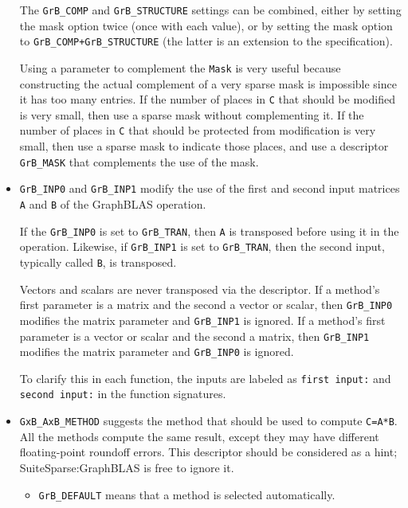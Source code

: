 \documentclass[12pt]{article}
\begin{document}
\begin{itemize}
    The \verb'GrB_COMP' and \verb'GrB_STRUCTURE' settings can be combined,
    either by setting the mask option twice (once with each value), or by
    setting the mask option to \verb'GrB_COMP+GrB_STRUCTURE' (the latter is an
    extension to the specification).

    Using a parameter to complement the \verb'Mask' is very useful because
    constructing the actual complement of a very sparse mask is impossible
    since it has too many entries.  If the number of places in \verb'C'
    that should be modified is very small, then use a sparse mask without
    complementing it.  If the number of places in \verb'C' that should
    be protected from modification is very small, then use a sparse mask
    to indicate those places, and use a descriptor \verb'GrB_MASK' that
    complements the use of the mask.

\item \verb'GrB_INP0' and \verb'GrB_INP1' modify the use of the
    first and second input matrices \verb'A' and \verb'B' of the GraphBLAS
    operation.

    If the \verb'GrB_INP0' is set to \verb'GrB_TRAN', then \verb'A' is
    transposed before using it in the operation.  Likewise, if
    \verb'GrB_INP1' is set to \verb'GrB_TRAN', then the second input,
    typically called \verb'B', is transposed.

    Vectors and scalars are never transposed via the descriptor.  If a method's
    first parameter is a matrix and the second a vector or scalar, then
    \verb'GrB_INP0' modifies the matrix parameter and
    \verb'GrB_INP1' is ignored.  If a method's first parameter is a
    vector or scalar and the second a matrix, then \verb'GrB_INP1'
    modifies the matrix parameter and \verb'GrB_INP0' is ignored.

    To clarify this in each function, the inputs are labeled as
    \verb'first input:' and \verb'second input:' in the function signatures.

\item \verb'GxB_AxB_METHOD' suggests the method that should be
    used to compute \verb'C=A*B'.  All the methods compute the same result,
    except they may have different floating-point roundoff errors.  This
    descriptor should be considered as a hint; SuiteSparse:GraphBLAS is
    free to ignore it.

    \begin{itemize}

    \item \verb'GrB_DEFAULT' means that a method is selected automatically.


\end{itemize}
\end{itemize}
\end{document}
